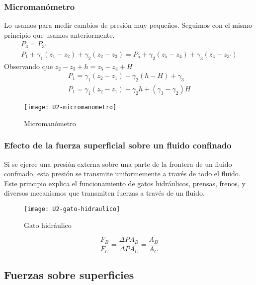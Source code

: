 \subsubsection{Micromanómetro}
Lo usamos para medir cambios de presión muy pequeños. Seguimos con el mismo principio que usamos anteriormente.
\begin{gather}
	P_{3}=P_{3'}\\
	P_{1} + \gamma_{1} (z_{1}-z_{2}) + \gamma_{2} (z_{2}-z_{3}) = P_{5} + \gamma_{2} (z_{5} - z_{4}) + \gamma_{3} (z_{4} - z_{3'})
\end{gather}
Observando que $z_{2}-z_{3} + h = z_{5} - z_{4} + H$
\begin{gather}
	P_{1} = \gamma_{1} (z_{2} - z_{1}) + \gamma_{2} (h- H) + \gamma_{3} \\
	P_{1} = \gamma_{1} (z_{2} - z_{1}) + \gamma_{2} h + (\gamma_{3} -\gamma_{2}) H
\end{gather}

\begin{figure}[h]
	\centering
	\texttt{[image: U2-micromanometro]}
	\caption{Micromanómetro}
	\label{fig:micro}
\end{figure}
\subsubsection{Efecto de la fuerza superficial sobre un fluido confinado}
Si se ejerce una presión externa sobre una parte de la frontera de un fluido confinado, esta presión se transmite uniformemente a través de todo el fluido.
\\
Este principio explica el funcionamiento de gatos hidráulicos, prensas, frenos, y diversos mecanismos que transmiten fuerzas a través de un fluido.


\begin{figure}[h]	
	\centering
	\texttt{[image: U2-gato-hidraulico]}
	\caption{Gato hidráulico}
	\label{fig:gato}
\end{figure}

\begin{equation}
	\dfrac{F_{B}}{F_{C}} = \dfrac{\Delta P A_{B}}{\Delta P A_{C}} = \dfrac{A_{B}}{A_{C}}
\end{equation}


\subsection{Fuerzas sobre superficies}
